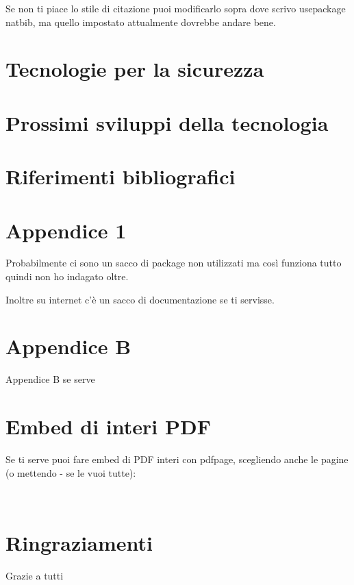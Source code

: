 \documentclass[12pt,a4paper,twoside]{book}
\begin{document}
Se non ti piace lo stile di citazione puoi modificarlo sopra dove scrivo usepackage natbib, ma quello impostato attualmente dovrebbe andare bene.

\chapter{Tecnologie per la sicurezza}

\chapter{Prossimi sviluppi della tecnologia}

\renewcommand{\bibsection}{}
\chapter*{Riferimenti bibliografici}

\newpage

\renewcommand{\appendixtocname}{Appendici}
\renewcommand{\appendixpagename}{Appendici}
{}
\begin{appendices}
\chapter{Appendice 1}
\label{Appendice:A}
Probabilmente ci sono un sacco di package non utilizzati ma così funziona tutto quindi non ho indagato oltre.

Inoltre su internet c'è un sacco di documentazione se ti servisse.
\chapter{Appendice B}
\label{Appendice:B}
Appendice B se serve

\chapter{Embed di interi PDF}
\label{Appendice:C}
Se ti serve puoi fare embed di PDF interi con pdfpage, scegliendo anche le pagine (o mettendo - se le vuoi tutte):


\end{appendices}

\newpage~\newpage
\chapter*{Ringraziamenti}
Grazie a tutti
\end{document}

